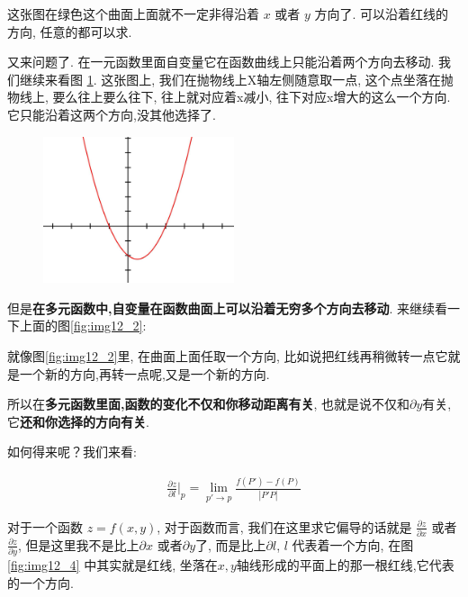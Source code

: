 这张图在绿色这个曲面上面就不一定非得沿着 $x$ 或者 $y$ 方向了. 可以沿着红线的方向, 任意的都可以求. 

又来问题了. 在一元函数里面自变量它在函数曲线上只能沿着两个方向去移动. 我们继续来看图 \ref{fig:img12_3}. 这张图上, 我们在抛物线上X轴左侧随意取一点, 这个点坐落在抛物线上, 要么往上要么往下, 往上就对应着x减小, 往下对应x增大的这么一个方向. 它只能沿着这两个方向,没其他选择了. 

\begin{figure}[ht]
  \centering
  \includegraphics[width=0.5\textwidth]{asset/20230901095921.png}
  \caption{}
  \label{fig:img12_3}
\end{figure}

但是\textbf{在多元函数中,自变量在函数曲面上可以沿着无穷多个方向去移动}. 来继续看一下上面的图\ref{fig:img12_2}: 

就像图\ref{fig:img12_2}里, 在曲面上面任取一个方向, 比如说把红线再稍微转一点它就是一个新的方向,再转一点呢,又是一个新的方向. 

所以在\textbf{多元函数里面,函数的变化不仅和你移动距离有关}, 也就是说不仅和$\partial y$有关, 它\textbf{还和你选择的方向有关}. 

如何得来呢？我们来看: 

\begin{align*}
  \frac{\partial z}{\partial l} \Bigg \vert _p = \lim_{p' \to p} \frac{f(P') - f(P)}{|P'P|}
\end{align*}

对于一个函数 $z=f(x,y)$, 对于函数而言, 我们在这里求它偏导的话就是 $\frac{\partial z}{\partial x}$ 或者 $\frac{\partial z}{\partial y}$, 但是这里我不是比上$\partial x$ 或者$\partial y$了, 而是比上$\partial l$, $l$ 代表着一个方向, 在图\ref{fig:img12_4} 中其实就是红线, 坐落在$x, y$轴线形成的平面上的那一根红线,它代表的一个方向. 

